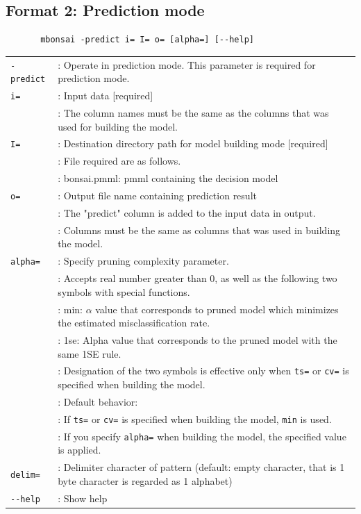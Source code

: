 \newpage
\subsection{Format 2: Prediction mode}

\begin{verbatim}
       mbonsai -predict i= I= o= [alpha=] [--help]
\end{verbatim}

\begin{table}[htbp]
{\small
\begin{tabular}{ll}
\verb|-predict| & : Operate in prediction mode. This parameter is required for prediction mode. \\
\verb|i=|       & : Input data [required]  \\
                & : The column names must be the same as the columns that was used for building the model.  \\
\verb|I=|       & : Destination directory path for model building mode [required]  \\
                & : File required are as follows. \\
                & :   bonsai.pmml: pmml containing the decision model  \\
\verb|o=|       & : Output file name containing prediction result \\
                & :    The "predict" column is added to the input data in output. \\
                & : Columns must be the same as columns that was used in building the model.  \\
\verb|alpha=|   & : Specify pruning complexity parameter.  \\
                & : Accepts real number greater than 0, as well as the following two symbols with special functions. \\
                & :   min: $\alpha$ value that corresponds to pruned model which minimizes the estimated misclassification rate. \\
                & :   1se: Alpha value that corresponds to the pruned model with the same 1SE rule.  \\
                & :    Designation of the two symbols is effective only when \verb|ts=|  or  \verb|cv=| is specified when building the model.     \\
                & : Default behavior: \\
                & : If  \verb|ts=| or  \verb|cv=| is specified when building the model, \verb|min| is used. \\
                & : If you specify \verb|alpha=| when building the model, the specified value is applied.   \\
\verb|delim=|   & : Delimiter character of pattern (default: empty character, that is 1 byte character is regarded as 1 alphabet)  \\
\verb|--help|   & : Show help \\

\end{tabular} 
}
\end{table} 


